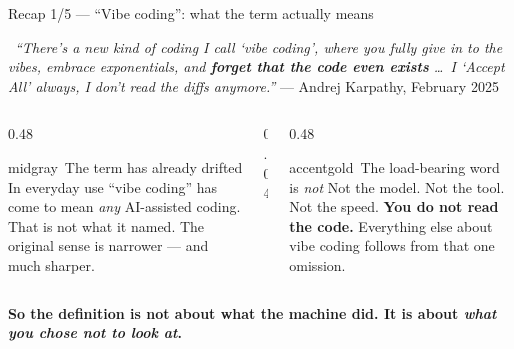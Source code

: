 
\begin{frame}{Recap 1/5 --- ``Vibe coding'': what the term actually means}
  \begin{calloutbox}[accentgold]
    \small\faQuoteLeft\ \emph{``There's a new kind of coding I call `vibe coding', where you fully
    give in to the vibes, embrace exponentials, and \textbf{forget that the code even exists}
    \ldots\ I `Accept All' always, I don't read the diffs anymore.''}
    \hfill{\scriptsize\color{midgray}--- Andrej Karpathy, February 2025}
  \end{calloutbox}
  \vspace{6pt}
  \begin{columns}[t, totalwidth=\textwidth]
    \begin{column}{0.48\textwidth}
      \begin{featbox}{midgray}{\ The term has already drifted}
        \scriptsize
        In everyday use ``vibe coding'' has come to mean \emph{any} AI-assisted coding.
        That is not what it named. The original sense is narrower --- and much sharper.
      \end{featbox}
    \end{column}
    \begin{column}{0.04\textwidth}\end{column}
    \begin{column}{0.48\textwidth}
      \begin{featbox}{accentgold}{\faEyeSlash\ The load-bearing word is \emph{not}}
        \scriptsize
        Not the model. Not the tool. Not the speed. \textbf{You do not read the code.}
        Everything else about vibe coding follows from that one omission.
      \end{featbox}
    \end{column}
  \end{columns}
  \vspace{4pt}
  \begin{center}\small\color{labnavy}\bfseries
    So the definition is not about what the machine did. It is about \emph{what you chose not to look at}.\end{center}
\end{frame}


